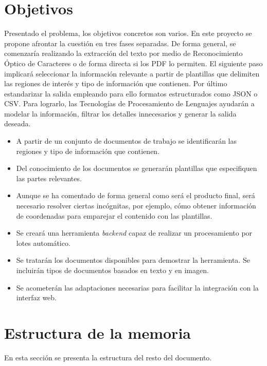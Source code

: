 \section{Objetivos} 

Presentado el problema, los objetivos concretos son varios. En este proyecto se propone afrontar la cuestión en tres fases separadas. De forma general, se comenzaría realizando la extracción del texto por medio de Reconocimiento Óptico de Caracteres o de forma directa si los PDF lo permiten. El siguiente paso implicará seleccionar la información relevante a partir de plantillas que delimiten las regiones de interés y tipo de información que contienen. Por último estandarizar la salida empleando para ello formatos estructurados como JSON o CSV. Para lograrlo, las Tecnologías de Procesamiento de Lenguajes ayudarán a modelar la información, filtrar los detalles innecesarios y generar la salida deseada.

\begin{itemize}
    \item A partir de un conjunto de documentos de trabajo se identificarán las regiones y tipo de información que contienen.
    \item Del conocimiento de los documentos se generarán plantillas que especifiquen las partes relevantes.
    \item Aunque se ha comentado de forma general como será el producto final, será necesario resolver ciertas incógnitas, por ejemplo, cómo obtener información de coordenadas para emparejar el contenido con las plantillas.
    \item Se creará una herramienta \emph{backend} capaz de realizar un procesamiento por lotes automático.
    \item Se tratarán los documentos disponibles para demostrar la herramienta. Se incluirán tipos de documentos basados en texto y en imagen.
    \item Se acometerán las adaptaciones necesarias para facilitar la integración con la interfaz web.
\end{itemize}

\section{Estructura de la memoria}

En esta sección se presenta la estructura del resto del documento.

